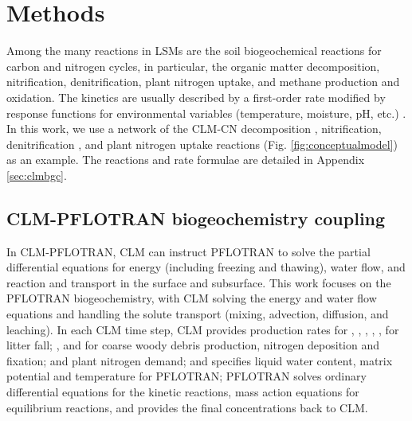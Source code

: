 \documentclass[gmd, manuscript]{copernicus}
\begin{document}
\section{Methods}
Among the many reactions in LSMs are the soil biogeochemical reactions for
carbon and nitrogen cycles,
in particular, the organic matter decomposition, nitrification,
denitrification, plant nitrogen uptake, and methane production and oxidation.
The kinetics are usually described by a first-order rate modified by response
functions for environmental variables (temperature, moisture, pH, etc.)
\citep{Bonan2012,Boyer2006,Schmidt2011}.  In this work, we use a network of the CLM-CN
decomposition \citep{Bonan2012,Oleson2013,Thornton2005}, nitrification,
denitrification \citep{Dickinson2002,Parton2001,Parton1996}, and plant nitrogen
uptake reactions (Fig. \ref{fig:conceptualmodel}) as an example. The reactions
and rate formulae are detailed in Appendix \ref{sec:clmbgc}.

\subsection{CLM-PFLOTRAN biogeochemistry coupling}
In CLM-PFLOTRAN, CLM can instruct PFLOTRAN to solve the partial differential
equations for energy (including freezing and thawing), water flow, and reaction
and transport in the surface and subsurface. 
This work focuses on the
PFLOTRAN biogeochemistry, with CLM solving the energy and water flow equations and handling
the solute transport (mixing, advection, diffusion, and leaching). In each CLM
time step, CLM provides production rates for , ,
, , ,  for litter fall;
, and  for coarse woody debris production, nitrogen
deposition and fixation; and plant nitrogen demand; and specifies liquid water
content, matrix potential and temperature for PFLOTRAN; PFLOTRAN solves 
ordinary differential equations for the kinetic reactions, mass action
equations for equilibrium reactions, and provides the final concentrations
back to CLM.   
\end{document}
